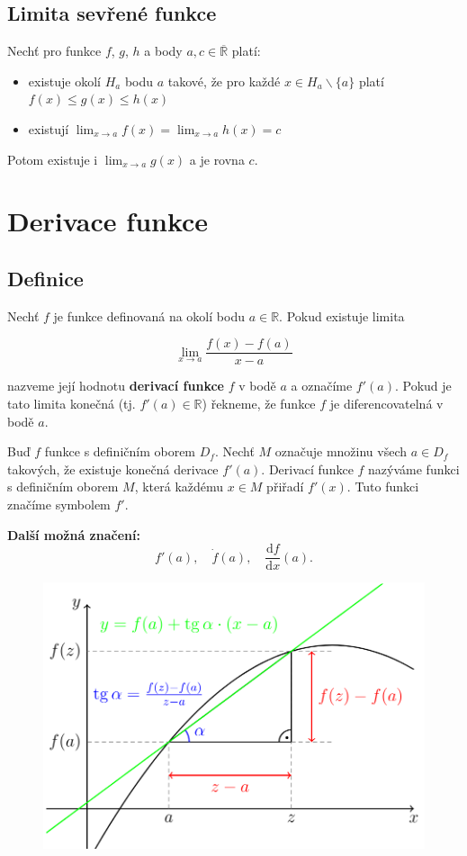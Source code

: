 \documentclass{szzclass}
\begin{document}
\subsection{Limita sevřené funkce}

Nechť pro funkce $f$, $g$, $h$ a body $a, c \in \overline{\mathbb{R}}$ platí:
\begin{itemize}
    \item existuje okolí $H_a$ bodu $a$ takové, že pro každé $x\in H_a\backslash\{a\}$ platí $f(x) \leq g(x) \leq h(x)$
    \item existují $\displaystyle\lim_{x\to a}f(x) = \lim_{x\to a}h(x) = c$
\end{itemize}

Potom existuje i
$\displaystyle\lim_{x\to a} g(x)$
a je rovna $c$.

\newpage

\section{Derivace funkce}

\subsection{Definice}

Nechť $f$ je funkce definovaná na okolí bodu $a\in\mathbb{R}$. Pokud existuje limita


\begin{equation*}
\lim_{x\to a} \frac{f(x) - f(a)}{x-a}\end{equation*}

nazveme její hodnotu \textbf{derivací funkce} $f$ v bodě $a$
a označíme $f'(a)$. Pokud je tato limita konečná
(tj. $f'(a) \in \mathbb{R}$) řekneme, že funkce $f$
je diferencovatelná v bodě $a$.

Buď $f$ funkce s definičním oborem $D_f$. Nechť $M$
označuje množinu všech $a\in D_f$ takových, že existuje
konečná derivace $f'(a)$. Derivací funkce $f$ nazýváme
funkci s definičním oborem $M$, která každému $x \in M$
přiřadí $f'(x)$. Tuto funkci značíme symbolem $f'$.

\textbf{Další možná značení:}
\begin{equation*}
f'(a), \quad \dot{f}(a), \quad \frac{\mathrm{d}f}{\mathrm{d}x}(a).\end{equation*}

\begin{figure}[h]
    \includegraphics[width=.6\textwidth, center]{topics/bi-spol-34/images/tecna.png}
\end{figure}
\end{document}
